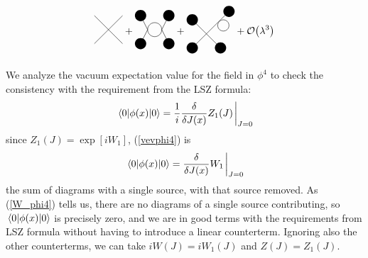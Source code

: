 \begin{equation}
\begin{aligned}
\begin{gathered}
\begin{tikzpicture}
        \draw (-0.5,-0.5) -- (0.5,0.5);
        \draw (-0.5,0.5) -- (0.5,-0.5);
        \end{tikzpicture}
    \end{gathered}+
    \begin{gathered}
        \begin{tikzpicture}
        \fill [black] (-0.5,-0.5) circle (0.2 cm);
        \fill [black] (-0.5,0.5) circle (0.2 cm);
        \fill [black] (0.5,0.5) circle (0.2 cm);
        \fill [black] (0.5,-0.5) circle (0.2 cm);
        \draw (0,0) circle (0.25 cm);
        \draw (-0.5,-0.5) -- (-0.25,0);
        \draw (-0.5,0.5) -- (-0.25,0);
        \draw (0.5,0.5) -- (0.25,0);
        \draw (0.5,-0.5) -- (0.25,0);
        \end{tikzpicture}
    \end{gathered}+
    \begin{gathered}
        \begin{tikzpicture}
        \fill [black] (-0.5,-0.5) circle (0.2 cm);
        \fill [black] (-0.5,0.5) circle (0.2 cm);
        \fill [black] (0.8,0.8) circle (0.2 cm);
        \fill [black] (0.5,-0.5) circle (0.2 cm);
        \draw (-0.5,-0.5) -- (0.8,0.8);
        \draw (-0.5,0.5) -- (0.5,-0.5);
        \draw (0.6,0.3) circle (0.2 cm);
        \end{tikzpicture}
    \end{gathered}
    +\order{\lambda^3}
    \end{aligned}
    \label{W_phi4}
\end{equation}

We analyze the vacuum expectation value for the field in $\phi^4$ to check the consistency with the requirement from the LSZ formula:
\begin{equation}
    \vev{\phi(x)}=\frac{1}{i}\fdv{J(x)}Z_1(J)\eval_{J=0}
    \label{vevphi4}
\end{equation}
since $Z_1(J)=\exp[iW_1]$, (\ref{vevphi4}) is
\begin{equation}
    \vev{\phi(x)}=\fdv{J(x)}W_1\eval_{J=0}
\end{equation}
the sum of diagrams with a single source, with that source removed. As (\ref{W_phi4}) tells us, there are no diagrams of a single source contributing, so $\vev{\phi(x)}$ is precisely zero, and we are in good terms with the requirements from LSZ formula without having to introduce a linear counterterm. Ignoring also the other counterterms, we can take $iW(J)=iW_1(J)$ and $Z(J)=Z_1(J)$.


